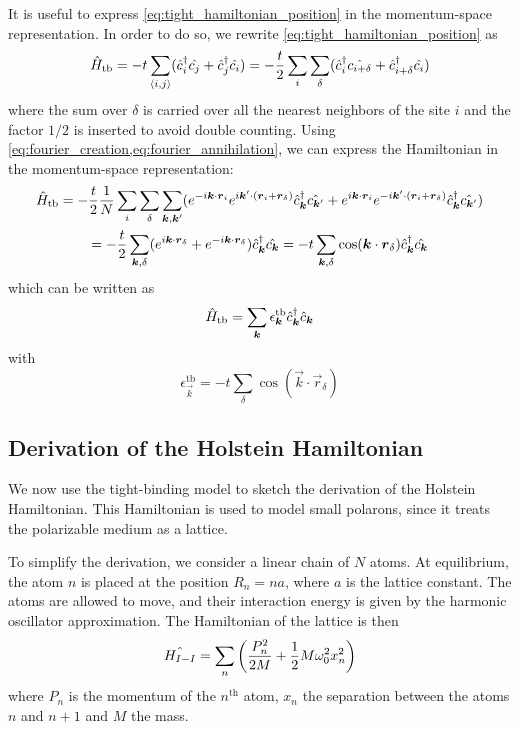 It is useful to express \cref{eq:tight_hamiltonian_position} in the momentum-space representation. In order to do so, we rewrite \cref{eq:tight_hamiltonian_position} as
\begin{equation}
    \hat{H}_\text{tb} = -t \sum_{\langle i,j \rangle} (\hat{c}^\dagger_i\hat{c_j} +  \hat{c}^\dagger_j\hat{c_i})
    = -\frac{t}{2} \sum_{i} \sum_\delta (\hat{c}^\dagger_i\hat{c_{i+\delta}} +  \hat{c}^\dagger_{i+\delta}\hat{c_i})
\end{equation}
where the sum over $\delta$ is carried over all the nearest neighbors of the site $i$ and the factor $1/2$ is inserted to avoid double counting. Using \cref{eq:fourier_creation,eq:fourier_annihilation}, we can express the Hamiltonian in the momentum-space representation:
\begin{multline}
    \hat{H}_\text{tb}
    = -\frac{t}{2} \frac{1}{N} \sum_{i} \sum_\delta \sum_{\mathbf{\boldsymbol{k}}, \mathbf{\boldsymbol{k}}'}
    (e^{-i\mathbf{\boldsymbol{k}}\cdot\mathbf{\boldsymbol{r}}_i} e^{i\mathbf{\boldsymbol{k}}'\cdot(\mathbf{\boldsymbol{r}}_i+\mathbf{\boldsymbol{r}}_\delta)} \hat{c}^\dagger_{\mathbf{\boldsymbol{k}}} \hat{c_{\mathbf{\boldsymbol{k}}'}} +
    e^{i\mathbf{\boldsymbol{k}}\cdot\mathbf{\boldsymbol{r}}_i} e^{-i\mathbf{\boldsymbol{k}}'\cdot(\mathbf{\boldsymbol{r}}_i+\mathbf{\boldsymbol{r}}_\delta)} \hat{c}^\dagger_{\mathbf{\boldsymbol{k}}} \hat{c_{\mathbf{\boldsymbol{k}}'}}) \\
    = -\frac{t}{2} \sum_{\mathbf{\boldsymbol{k}},\delta} (e^{i\mathbf{\boldsymbol{k}}\cdot\mathbf{\boldsymbol{r}}_\delta}+e^{-i\mathbf{\boldsymbol{k}}\cdot\mathbf{\boldsymbol{r}}_\delta})  \hat{c}^\dagger_{\mathbf{\boldsymbol{k}}} \hat{c_{\mathbf{\boldsymbol{k}}}}
    = -t \sum_{\mathbf{\boldsymbol{k}},\delta} \cos(\mathbf{\boldsymbol{k}}\cdot\mathbf{\boldsymbol{r}}_\delta) \hat{c}^\dagger_{\mathbf{\boldsymbol{k}}} \hat{c_{\mathbf{\boldsymbol{k}}}}
\end{multline}
which can be written as
\begin{equation} \label{eq:tight_hamiltonian_momentum}
    \hat{H}_\text{tb} = \sum_{\mathbf{\boldsymbol{k}}} \epsilon_{\mathbf{\boldsymbol{k}}}^\text{tb} \hat{c}^\dagger_{\mathbf{\boldsymbol{k}}}\hat{c}_{\mathbf{\boldsymbol{k}}}
\end{equation}
with
\begin{equation}
    \epsilon_\vec{k}^\text{tb} = -t \sum_{    \delta} \cos(\vec{k}\cdot\vec{r}_\delta)
\end{equation}

\subsection{Derivation of the Holstein Hamiltonian}
We now use the tight-binding model to sketch the derivation of the Holstein Hamiltonian. This Hamiltonian is used to model small polarons, since it treats the polarizable medium as a lattice.

To simplify the derivation, we consider a linear chain of $N$ atoms. At equilibrium, the atom $n$ is placed at the position $R_n = na$, where $a$ is the lattice constant. The atoms are allowed to move, and their interaction energy is given by the harmonic oscillator approximation. The Hamiltonian of the lattice is then
\begin{equation}
    \hat{H_{I-I}} = \sum_n \left( \frac{{P}_n^2}{2M} + \frac{1}{2} M\omega_0^2x_n^2 \right)
\end{equation}
where $P_n$ is the momentum of the $n^\text{th}$ atom, $x_n$ the separation between the atoms $n$ and $n+1$ and $M$ the mass.

